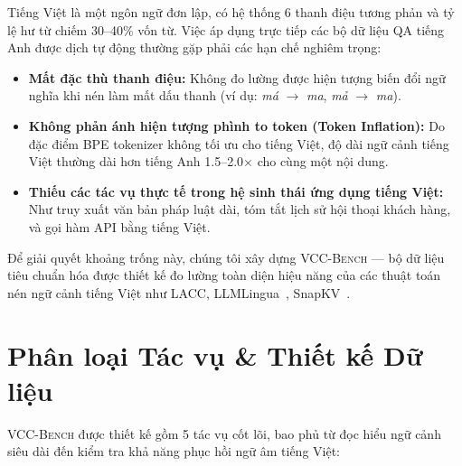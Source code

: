 \documentclass[12pt,a4paper]{article}
\newcommand{\method}[1]{\textsc{#1}}
\newcommand{\viet}[1]{\textit{#1}}
\begin{document}
Tiếng Việt là một ngôn ngữ đơn lập, có hệ thống 6 thanh điệu tương phản và tỷ lệ hư từ chiếm 30--40\% vốn từ. Việc áp dụng trực tiếp các bộ dữ liệu QA tiếng Anh được dịch tự động thường gặp phải các hạn chế nghiêm trọng:
\begin{itemize}
    \item \textbf{Mất đặc thù thanh điệu:} Không đo lường được hiện tượng biến đổi ngữ nghĩa khi nén làm mất dấu thanh (ví dụ: \viet{má} $\to$ \viet{ma}, \viet{mả} $\to$ \viet{ma}).
    \item \textbf{Không phản ánh hiện tượng phình to token (Token Inflation):} Do đặc điểm BPE tokenizer không tối ưu cho tiếng Việt, độ dài ngữ cảnh tiếng Việt thường dài hơn tiếng Anh 1.5--2.0$\times$ cho cùng một nội dung.
    \item \textbf{Thiếu các tác vụ thực tế trong hệ sinh thái ứng dụng tiếng Việt:} Như truy xuất văn bản pháp luật dài, tóm tắt lịch sử hội thoại khách hàng, và gọi hàm API bằng tiếng Việt.
\end{itemize}

Để giải quyết khoảng trống này, chúng tôi xây dựng \method{VCC-Bench} --- bộ dữ liệu tiêu chuẩn hóa được thiết kế đo lường toàn diện hiệu năng của các thuật toán nén ngữ cảnh tiếng Việt như \method{LACC}, LLMLingua~\cite{jiang2023llmlingua}, SnapKV~\cite{li2024snapkv}.

\section{Phân loại Tác vụ & Thiết kế Dữ liệu}

\method{VCC-Bench} được thiết kế gồm 5 tác vụ cốt lõi, bao phủ từ đọc hiểu ngữ cảnh siêu dài đến kiểm tra khả năng phục hồi ngữ âm tiếng Việt:
\end{document}
